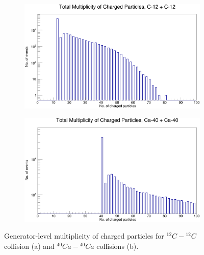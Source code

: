 \documentclass[12pt]{article}
\begin{document}
\begin{figure}[h]
\centering
\begin{subfigure}[h]{0.49\textwidth}
\centering
\includegraphics[width=\textwidth, height=0.33\textheight]{GeneratorTotalMultiplicity_C12.png}
\caption{}
\label{Total multiplicity of all charged particles C12.}
\end{subfigure}
\hfill
\begin{subfigure}[h]{0.49\textwidth}
	\centering
	\includegraphics[width=\textwidth, height=0.33\textheight]{GeneratorTotalMultiplicity_Ca40.png}
	\caption{}
	\label{Total multiplicity of all charged particles Ca40.}
\end{subfigure}
\caption{Generator-level multiplicity of charged particles for $^{12}C-{^{12}C}$ collision (a)
	and $^{40}Ca-{^{40}Ca}$ collisions (b).}
\label{gen-multipl}
\end{figure}

\clearpage
\end{document}
